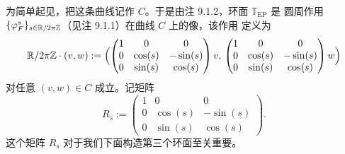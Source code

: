 为简单起见，把这条曲线记作 $C$。于是由注 9.1.2，环面 $\mathbb{T}_{\mathrm{EP}}$ 是
圆周作用 $\{\varphi_F^s\}_{s\in\mathbb{R}/2\pi\mathbb{Z}}$（见注 9.1.1）在曲线 $C$ 上的像，该作用
定义为
\begin{equation*}
  \mathbb{R}/2\pi\mathbb{Z}\cdot(v,w):=\Bigl(
  \begin{pmatrix}1&0&0\\0&\cos(s)&-\sin(s)\\0&\sin(s)&\cos(s)\end{pmatrix}v,\,
  \begin{pmatrix}1&0&0\\0&\cos(s)&-\sin(s)\\0&\sin(s)&\cos(s)\end{pmatrix}w\Bigr)
\end{equation*}
对任意 $(v,w)\in C$ 成立。记矩阵
\begin{equation}\tag{9.8}
  R_s:=\begin{pmatrix}1&0&0\\0&\cos(s)&-\sin(s)\\0&\sin(s)&\cos(s)\end{pmatrix}.
\end{equation}
这个矩阵 $R_s$ 对于我们下面构造第三个环面至关重要。

